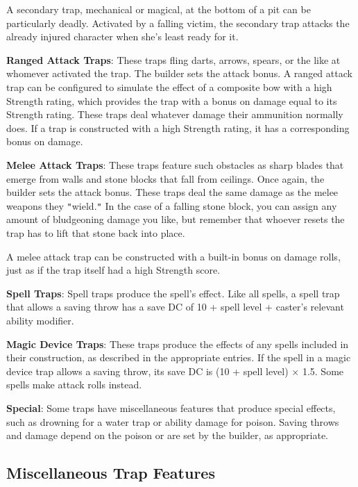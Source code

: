 A secondary trap, mechanical or magical, at the bottom of a pit can be particularly deadly. Activated by a falling victim, the secondary trap attacks the already injured character when she's least ready for it.
				
\textbf{Ranged Attack Traps}: These traps fling darts, arrows, spears, or the like at whomever activated the trap. The builder sets the attack bonus. A ranged attack trap can be configured to simulate the effect of a composite bow with a high Strength rating, which provides the trap with a bonus on damage equal to its Strength rating. These traps deal whatever damage their ammunition normally does. If a trap is constructed with a high Strength rating, it has a corresponding bonus on damage.
				
\textbf{Melee Attack Traps}: These traps feature such obstacles as sharp blades that emerge from walls and stone blocks that fall from ceilings. Once again, the builder sets the attack bonus. These traps deal the same damage as the melee weapons they \texttt{{}"{}}wield.\texttt{{}"{}} In the case of a falling stone block, you can assign any amount of bludgeoning damage you like, but remember that whoever resets the trap has to lift that stone back into place. 
				
A melee attack trap can be constructed with a built-in bonus on damage rolls, just as if the trap itself had a high Strength score.
				
\textbf{Spell Traps}: Spell traps produce the spell's effect\textit{. }Like all spells, a spell trap that allows a saving throw has a save DC of 10 + spell level + caster's relevant ability modifier.
				
\textbf{Magic Device Traps}: These traps produce the effects of any spells included in their construction, as described in the appropriate entries\textit{. }If the spell in a magic device trap allows a saving throw, its save DC is (10 + spell level) \mbox{$\times$} 1.5. Some spells make attack rolls instead.
				
\textbf{Special}: Some traps have miscellaneous features that produce special effects, such as drowning for a water trap or ability damage for poison. Saving throws and damage depend on the poison or are set by the builder, as appropriate.
				
\subsection{Miscellaneous Trap Features}

